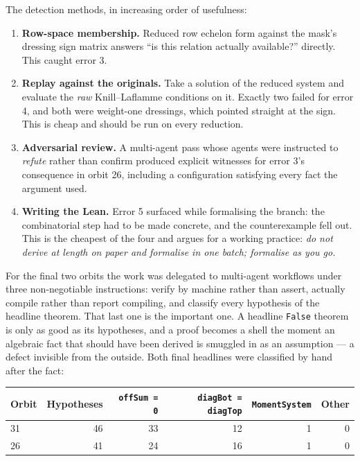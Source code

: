 \documentclass[11pt,a4paper]{article}
\newcommand{\lean}[1]{\texttt{#1}}
\theoremstyle{definition}
\begin{document}
The detection methods, in increasing order of usefulness:

\begin{enumerate}
\item \textbf{Row-space membership.} Reduced row echelon form against the mask's
  dressing sign matrix answers ``is this relation actually available?'' directly.
  This caught error 3.
\item \textbf{Replay against the originals.} Take a solution of the reduced
  system and evaluate the \emph{raw} Knill--Laflamme conditions on it. Exactly two
  failed for error 4, and both were weight-one dressings, which pointed straight
  at the sign. This is cheap and should be run on every reduction.
\item \textbf{Adversarial review.} A multi-agent pass whose agents were
  instructed to \emph{refute} rather than confirm produced explicit witnesses for
  error 3's consequence in orbit 26, including a configuration satisfying every
  fact the argument used.
\item \textbf{Writing the Lean.} Error 5 surfaced while formalising the branch:
  the combinatorial step had to be made concrete, and the counterexample fell
  out. This is the cheapest of the four and argues for a working practice:
  \emph{do not derive at length on paper and formalise in one batch; formalise as
  you go.}
\end{enumerate}

For the final two orbits the work was delegated to multi-agent workflows under
three non-negotiable instructions: verify by machine rather than assert, actually
compile rather than report compiling, and classify every hypothesis of the
headline theorem. That last one is the important one. A headline
\lean{False} theorem is only as good as its hypotheses, and a proof becomes a
shell the moment an algebraic fact that should have been derived is smuggled in as
an assumption --- a defect invisible from the outside. Both final headlines were
classified by hand after the fact:

\begin{center}
\begin{tabular}{lrrrrr}
\toprule
Orbit & Hypotheses & \lean{offSum = 0} & \lean{diagBot = diagTop} &
  \lean{MomentSystem} & Other \\
\midrule
31 & 46 & 33 & 12 & 1 & 0 \\
26 & 41 & 24 & 16 & 1 & 0 \\
\bottomrule
\end{tabular}
\end{center}
\end{document}
